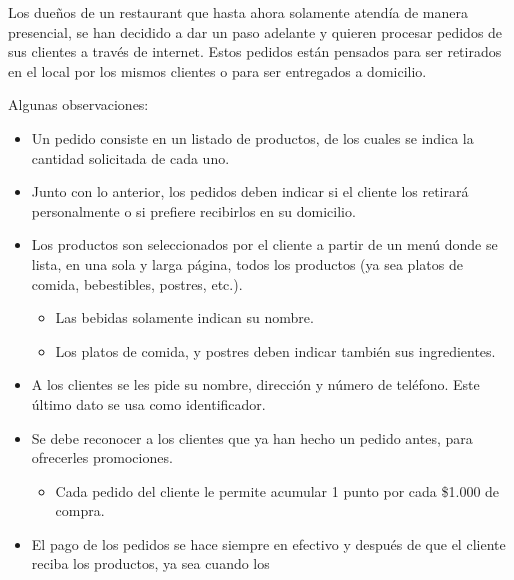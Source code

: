 \documentclass[11pt,letterpaper]{article}
\begin{document}
\begin{spacing}{1.2}
\thispagestyle{empty}
\evaluationTitle

\newcommand{\separatorLine}{\begin{center}\rule{.6\textwidth}{1pt}\end{center}}

\begin{Problem}

    Los dueños de un restaurant que hasta ahora solamente atendía de manera presencial, se
    han decidido a dar un paso adelante y quieren procesar pedidos de sus clientes a través
    de internet.  Estos pedidos
    están pensados para ser retirados en el local por los mismos clientes o para ser entregados a domicilio.

    Algunas observaciones:
    \begin{itemize}
        \item Un pedido consiste en un listado de productos, de los cuales se indica la cantidad solicitada de cada uno.
        \item Junto con lo anterior, los pedidos deben indicar si el cliente
            los retirará personalmente o si prefiere recibirlos en su domicilio.
        \item Los productos son seleccionados por el cliente a partir de un menú donde se lista, en una sola y larga
            página, todos los productos (ya sea platos de comida, bebestibles, postres, etc.).
        \begin{itemize}
            \item Las bebidas solamente indican su nombre.
            \item Los platos de comida,  y postres deben indicar también sus ingredientes.
        \end{itemize}
        \item A los clientes se les pide su nombre, dirección y número de teléfono. Este último dato
            se usa como identificador.
        \item Se debe reconocer a los clientes que ya han hecho un pedido antes, para ofrecerles promociones.
        \begin{itemize}
            \item Cada pedido del cliente le permite acumular 1 punto por cada \$1.000 de compra.
        \end{itemize}
        \item El pago de los pedidos se hace siempre en efectivo y
            después de que el cliente reciba los productos, ya sea cuando los

\end{itemize}
\end{Problem}
\end{spacing}
\end{document}
